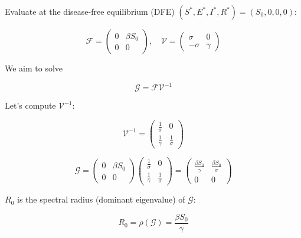 \documentclass[
  ignorenonframetext,
]{beamer}
\begin{document}
\begin{frame}
Evaluate at the disease-free equilibrium (DFE)
\((S^*, E^*, I^*, R^*) = (S_0, 0, 0, 0)\):

\begin{equation*}
\mathcal{F} = \begin{pmatrix}
0 & \beta S_0 \\
0 & 0
\end{pmatrix},
\quad
\mathcal{V} = \begin{pmatrix}
\sigma & 0 \\
-\sigma & \gamma
\end{pmatrix}
\end{equation*}
\end{frame}

\begin{frame}
We aim to solve

\begin{equation*}
\mathcal{G} = \mathcal{F} \mathcal{V}^{-1}
\end{equation*}

Let's compute \(\mathcal{V}^{-1}\):

\begin{equation*}
\mathcal{V}^{-1} = \begin{pmatrix}
\frac{1}{\sigma} & 0 \\
\frac{1}{\gamma} & \frac{1}{\sigma}
\end{pmatrix}
\end{equation*}
\end{frame}

\begin{frame}
\begin{equation*}
\mathcal{G} = \begin{pmatrix}
0 & \beta S_0 \\
0 & 0
\end{pmatrix}
\begin{pmatrix}
\frac{1}{\sigma} & 0 \\
\frac{1}{\gamma} & \frac{1}{\sigma}
\end{pmatrix}
= \begin{pmatrix}
\frac{\beta S_0}{\gamma} & \frac{\beta S_0}{\sigma} \\
0 & 0
\end{pmatrix}
\end{equation*}
\end{frame}

\begin{frame}
\(R_0\) is the spectral radius (dominant eigenvalue) of \(\mathcal{G}\):

\begin{equation*}
R_0 = \rho(\mathcal{G}) = \frac{\beta S_0}{\gamma}
\end{equation*}
\end{frame}
\end{document}
